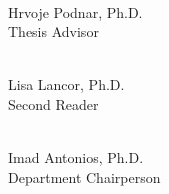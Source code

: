 \documentclass[12pt]{report}
\begin{document}
\begin{flushright}

\makebox[2in]{\hrulefill} \\
Hrvoje Podnar, Ph.D. \\
Thesis Advisor

\vspace{0.5in}

\makebox[2in]{\hrulefill} \\
Lisa Lancor, Ph.D. \\
Second Reader

\end{flushright}

\begin{flushleft}
\makebox[2in]{\hrulefill} \\
Imad Antonios, Ph.D. \\
Department Chairperson
\end{flushleft}
\end{document}
